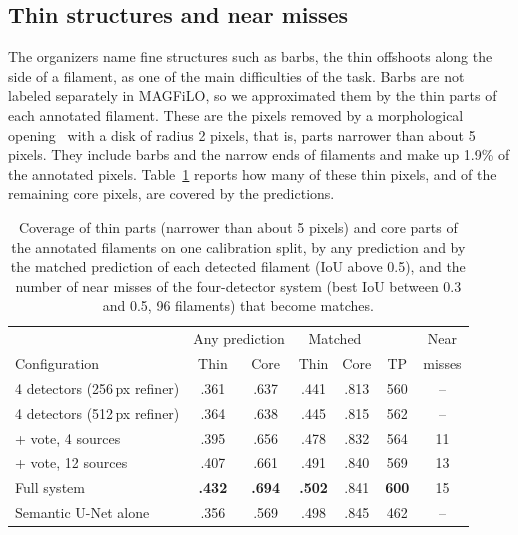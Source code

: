 \documentclass[conference]{IEEEtran}
\begin{document}
\subsection{Thin structures and near misses}
\label{sec:thin}
The organizers name fine structures such as barbs, the thin offshoots along the side of a filament, as one of the main difficulties of the task. Barbs are not labeled separately in MAGFiLO, so we approximated them by the thin parts of each annotated filament. These are the pixels removed by a morphological opening~\cite{haralick1987morphology} with a disk of radius 2 pixels, that is, parts narrower than about 5 pixels. They include barbs and the narrow ends of filaments and make up 1.9\% of the annotated pixels. Table~\ref{tab:thin} reports how many of these thin pixels, and of the remaining core pixels, are covered by the predictions.

\begin{table}[t]
\centering
\caption{Coverage of thin parts (narrower than about 5 pixels) and core parts of the annotated filaments on one calibration split, by any prediction and by the matched prediction of each detected filament (IoU above 0.5), and the number of near misses of the four-detector system (best IoU between 0.3 and 0.5, 96 filaments) that become matches.}
\label{tab:thin}
\setlength{\tabcolsep}{2.2pt}
\footnotesize
\begin{tabular}{lcccccc}
\toprule
 & \multicolumn{2}{c}{Any prediction} & \multicolumn{2}{c}{Matched} & & Near \\
Configuration & Thin & Core & Thin & Core & TP & misses \\
\midrule
4 detectors (256\,px refiner) & .361 & .637 & .441 & .813 & 560 & -- \\
4 detectors (512\,px refiner) & .364 & .638 & .445 & .815 & 562 & -- \\
+ vote, 4 sources & .395 & .656 & .478 & .832 & 564 & 11 \\
+ vote, 12 sources & .407 & .661 & .491 & .840 & 569 & 13 \\
Full system & \textbf{.432} & \textbf{.694} & \textbf{.502} & .841 & \textbf{600} & 15 \\
Semantic U-Net alone & .356 & .569 & .498 & .845 & 462 & -- \\
\bottomrule
\end{tabular}
\end{table}
\end{document}
